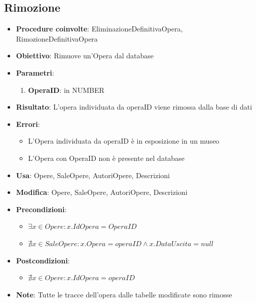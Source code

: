 \subsection{Rimozione}
\begin{itemize}
	\item \textbf{Procedure coinvolte}: EliminazioneDefinitivaOpera, RimozioneDefinitivaOpera
	\item \textbf{Obiettivo}: Rimuove un'Opera dal database
	\item \textbf{Parametri}:
	\begin{enumerate}
		\item \textbf{OperaID}: in NUMBER
	\end{enumerate}
	\item \textbf{Risultato}: L'opera individuata da operaID viene rimossa dalla base di dati
	\item \textbf{Errori}: 
	\begin{itemize}
		\item L'Opera individuata da operaID è in esposizione in un museo
		\item L'Opera con OperaID non è presente nel database
	\end{itemize}
	\item \textbf{Usa}: Opere, SaleOpere, AutoriOpere, Descrizioni
	\item \textbf{Modifica}: Opere, SaleOpere, AutoriOpere, Descrizioni
	\item \textbf{Precondizioni}:
	\begin{itemize}
		\item $\exists x \in Opere : x.IdOpera = OperaID$
		\item $\nexists x \in SaleOpere : x.Opera=operaID \land x.DataUscita = null$
	\end{itemize}
	\item \textbf{Postcondizioni}:
	\begin{itemize}
		\item $\nexists x \in Opere : x.IdOpera = operaID$
	\end{itemize}
	\item \textbf{Note}: Tutte le tracce dell'opera dalle tabelle modificate sono rimosse
\end{itemize}


